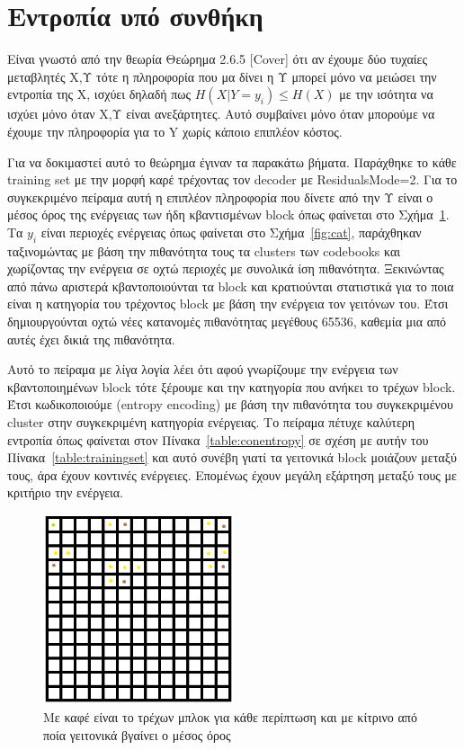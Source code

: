\section{Εντροπία υπό συνθήκη}
\label{section:sect45}

\indent Είναι γνωστό από την θεωρία Θεώρημα 2.6.5 [Cover] ότι αν έχουμε δύο τυχαίες μεταβλητές Χ,Υ τότε η πληροφορία που μα δίνει η Υ μπορεί μόνο να μειώσει την εντροπία της Χ, ισχύει δηλαδή πως $ H(X|Y=y_i) \leq H(X)$ με την ισότητα να ισχύει μόνο όταν Χ,Υ είναι ανεξάρτητες. Αυτό συμβαίνει μόνο όταν μπορούμε να έχουμε την πληροφορία για το Y χωρίς κάποιο επιπλέον κόστος. 

\indent Για να δοκιμαστεί αυτό το θεώρημα έγιναν τα παρακάτω βήματα. Παράχθηκε το κάθε training set με την μορφή καρέ τρέχοντας τον decoder με ResidualsMode=2. Για το συγκεκριμένο πείραμα αυτή η επιπλέον πληροφορία που δίνετε από την Υ είναι ο μέσος όρος της ενέργειας των ήδη κβαντισμένων block όπως φαίνεται στο Σχήμα~\ref{fig:averenergy}. Τα $y_i$ είναι περιοχές ενέργειας όπως φαίνεται στο Σχήμα~\ref{fig:cat}, παράχθηκαν ταξινομώντας με βάση την πιθανότητα τους τα clusters των codebooks και χωρίζοντας την ενέργεια σε οχτώ περιοχές με συνολικά ίση πιθανότητα. Ξεκινώντας από πάνω αριστερά κβαντοποιούνται τα block και κρατιούνται στατιστικά για το ποια είναι η κατηγορία του τρέχοντος block με βάση την ενέργεια τον γειτόνων του. Έτσι δημιουργούνται οχτώ νέες κατανομές πιθανότητας μεγέθους 65536, καθεμία μια από αυτές έχει δικιά της πιθανότητα.

\indent Αυτό το πείραμα με λίγα λογία λέει ότι αφού γνωρίζουμε την ενέργεια των κβαντοποιημένων block τότε ξέρουμε και την κατηγορία που ανήκει το τρέχων block. Έτσι κωδικοποιούμε (entropy encoding) με βάση την πιθανότητα του συγκεκριμένου cluster στην συγκεκριμένη κατηγορία ενέργειας. Το πείραμα πέτυχε καλύτερη εντροπία όπως φαίνεται στον Πίνακα~\ref{table:conentropy} σε σχέση με αυτήν του Πίνακα~\ref{table:trainingset} και αυτό συνέβη γιατί τα γειτονικά block μοιάζουν μεταξύ τους, άρα έχουν κοντινές ενέργειες. Επομένως έχουν μεγάλη εξάρτηση μεταξύ τους με κριτήριο την ενέργεια.

\begin{figure}[ht]
  \centering
  \includegraphics[width=0.5\textwidth]{chapter4/grid.png}
  \caption{Με καφέ είναι το τρέχων μπλοκ για κάθε περίπτωση και με κίτρινο από ποία γειτονικά βγαίνει ο μέσος όρος}
  \label{fig:averenergy}
\end{figure}

